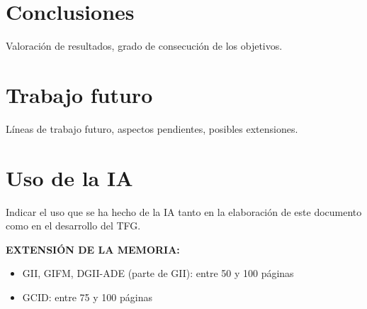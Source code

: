 \section{Conclusiones}

Valoración de resultados, grado de consecución de los  objetivos.

\section{Trabajo futuro}

Líneas de trabajo futuro, aspectos pendientes, posibles extensiones.

\section{Uso de la IA}

Indicar el uso que se ha hecho de la IA tanto en la elaboración de este documento como en el desarrollo del TFG.

\vspace{1cm}

\textbf{EXTENSIÓN DE LA MEMORIA:}

\begin{itemize}
    \item GII, GIFM, DGII-ADE (parte de GII): entre 50 y 100 páginas
    \item GCID: entre 75 y 100 páginas
\end{itemize}
